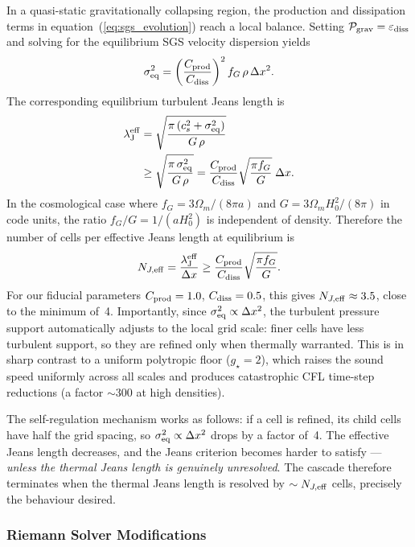 \documentclass[fleqn,usenatbib]{mnras}
\newcommand{\lJ}{\lambda_{\rm J}}
\newcommand{\gstar}{g_\star}
\newcommand{\dx}{\Delta x}
\begin{document}
In a quasi-static gravitationally collapsing region, the production
and dissipation terms in equation~(\ref{eq:sgs_evolution}) reach a
local balance.  Setting $\mathcal{P}_{\rm grav} = \varepsilon_{\rm diss}$
and solving for the equilibrium SGS velocity dispersion yields
\begin{equation}
  \sigma_{\rm eq}^2
  = \left(\frac{C_{\rm prod}}{C_{\rm diss}}\right)^2
    f_G\,\rho\,\dx^2.
  \label{eq:sigma_eq}
\end{equation}
The corresponding equilibrium turbulent Jeans length is
\begin{align}
  \lJ^{\rm eff}
  &= \sqrt{\frac{\pi\,(c_s^2 + \sigma_{\rm eq}^2)}{G\,\rho}}
  \nonumber\\
  &\ge \sqrt{\frac{\pi\,\sigma_{\rm eq}^2}{G\,\rho}}
  = \frac{C_{\rm prod}}{C_{\rm diss}}
    \sqrt{\frac{\pi f_G}{G}}\;\dx.
  \label{eq:jeans_eff}
\end{align}
In the cosmological case where $f_G = 3\Omega_m/(8\pi a)$ and
$G = 3\Omega_m H_0^2/(8\pi)$ in code units, the ratio
$f_G/G = 1/(aH_0^2)$ is independent of density.  Therefore
the number of cells per effective Jeans length at equilibrium is
\begin{equation}
  N_{J,\rm eff}
  = \frac{\lJ^{\rm eff}}{\dx}
  \ge \frac{C_{\rm prod}}{C_{\rm diss}}
      \sqrt{\frac{\pi f_G}{G}}.
  \label{eq:NJ_eff}
\end{equation}
For our fiducial parameters $C_{\rm prod} = 1.0$, $C_{\rm diss} = 0.5$,
this gives $N_{J,\rm eff} \approx 3.5$, close to the
\citet{Truelove1997} minimum of~4.  Importantly, since
$\sigma_{\rm eq}^2 \propto \dx^2$, the turbulent pressure support
automatically adjusts to the local grid scale: finer cells have less
turbulent support, so they are refined only when thermally warranted.
This is in sharp contrast to a uniform polytropic floor
($\gstar = 2$), which raises the sound speed uniformly across all
scales and produces catastrophic CFL time-step reductions (a factor
$\sim$300 at high densities).

The self-regulation mechanism works as follows: if a cell is refined,
its child cells have half the grid spacing, so
$\sigma_{\rm eq}^2 \propto \dx^2$ drops by a factor of~4.  The
effective Jeans length decreases, and the Jeans criterion becomes
harder to satisfy --- \emph{unless the thermal Jeans length is
genuinely unresolved}.  The cascade therefore terminates when the
thermal Jeans length is resolved by $\sim N_{J,\rm eff}$ cells,
precisely the behaviour desired.


\subsubsection{Riemann Solver Modifications}
\label{sec:sgs_riemann}
\end{document}
